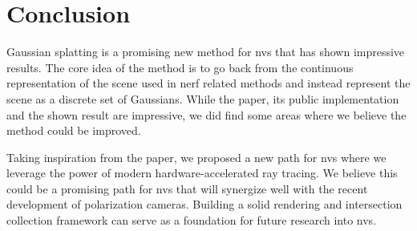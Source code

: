 \section{Conclusion}
Gaussian splatting is a promising new method for \gls{nvs} that has shown impressive results.
The core idea of the method is to go back from the continuous representation of the scene used in \gls{nerf} related methods and instead represent the scene as a discrete set of Gaussians.
While the paper, its public implementation and the shown result are impressive, we did find some areas where we believe the method could be improved.

Taking inspiration from the paper, we proposed a new path for \gls{nvs} where we leverage the power of modern hardware-accelerated ray tracing.
We believe this could be a promising path for \gls{nvs} that will synergize well with the recent development of polarization cameras.
Building a solid rendering and intersection collection framework can serve as a foundation for future research into \gls{nvs}.